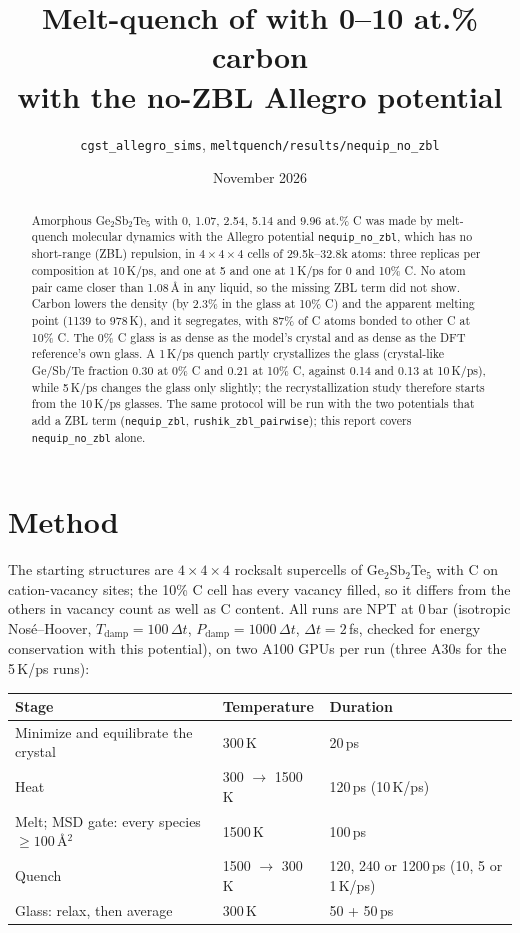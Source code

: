 \documentclass[11pt]{article}
\title{Melt-quench of \GST{} with 0--10 at.\% carbon\\ with the no-ZBL Allegro potential \nozbl}
\author{\texttt{cgst\_allegro\_sims}, \texttt{meltquench/results/nequip\_no\_zbl}}
\date{November 2026}
\newcommand{\GST}{Ge$_2$Sb$_2$Te$_5$}
\newcommand{\nozbl}{\texttt{nequip\_no\_zbl}}
\begin{document}
\maketitle

\begin{abstract}
Amorphous \GST{} with 0, 1.07, 2.54, 5.14 and 9.96 at.\% C was made by melt-quench molecular dynamics with the
Allegro potential \nozbl{}, which has no short-range (ZBL) repulsion, in $4\times4\times4$ cells of 29.5k--32.8k
atoms: three replicas per composition at 10\,K/ps, and one at 5 and one at 1\,K/ps for 0 and 10\% C. No atom pair
came closer than 1.08\,\AA{} in any liquid, so the missing ZBL term did not show. Carbon lowers the density (by
2.3\% in the glass at 10\% C) and the apparent melting point (1139 to 978\,K), and it segregates, with 87\% of C atoms
bonded to other C at 10\% C. The 0\% C glass is as dense as the model's crystal and as dense as the DFT reference's
own glass. A 1\,K/ps quench partly crystallizes the glass (crystal-like Ge/Sb/Te fraction 0.30 at 0\% C and 0.21 at
10\% C, against 0.14 and 0.13 at 10\,K/ps), while 5\,K/ps changes the glass only slightly; the recrystallization
study therefore starts from the 10\,K/ps glasses. The same protocol will be run with the two potentials that add a
ZBL term (\texttt{nequip\_zbl}, \texttt{rushik\_zbl\_pairwise}); this report covers \nozbl{} alone.
\end{abstract}

\section{Method}
The starting structures are $4\times4\times4$ rocksalt supercells of \GST{} with C on cation-vacancy sites; the 10\%
C cell has every vacancy filled, so it differs from the others in vacancy count as well as C content. All runs are
NPT at 0\,bar (isotropic Nos\'e--Hoover, $T_\text{damp}=100\,\Delta t$, $P_\text{damp}=1000\,\Delta t$,
$\Delta t=2$\,fs, checked for energy conservation with this potential), on two A100 GPUs per run (three A30s for the
5\,K/ps runs):

\begin{table}[H]
\centering
\begin{tabular}{lll}
\toprule
Stage & Temperature & Duration \\
\midrule
Minimize and equilibrate the crystal & 300\,K & 20\,ps \\
Heat & 300 $\to$ 1500\,K & 120\,ps (10\,K/ps) \\
Melt; MSD gate: every species $\geq 100$\,\AA$^2$ & 1500\,K & 100\,ps \\
Quench & 1500 $\to$ 300\,K & 120, 240 or 1200\,ps (10, 5 or 1\,K/ps) \\
Glass: relax, then average & 300\,K & 50 + 50\,ps \\
\bottomrule
\end{tabular}
\end{table}
\end{document}
